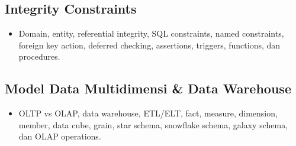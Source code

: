 \documentclass[11pt,a4paper]{article}
\begin{document}
\subsection{Integrity Constraints}
\begin{itemize}
    \item Domain, entity, referential integrity, SQL constraints, named constraints, foreign key action, deferred checking, assertions, triggers, functions, dan procedures.
\end{itemize}

\subsection{Model Data Multidimensi \& Data Warehouse}
\begin{itemize}
    \item OLTP vs OLAP, data warehouse, ETL/ELT, fact, measure, dimension, member, data cube, grain, star schema, snowflake schema, galaxy schema, dan OLAP operations.
\end{itemize}

\newpage

\newpage

\newpage

\newpage

\newpage

\newpage

\newpage

\newpage

\newpage

\end{document}
